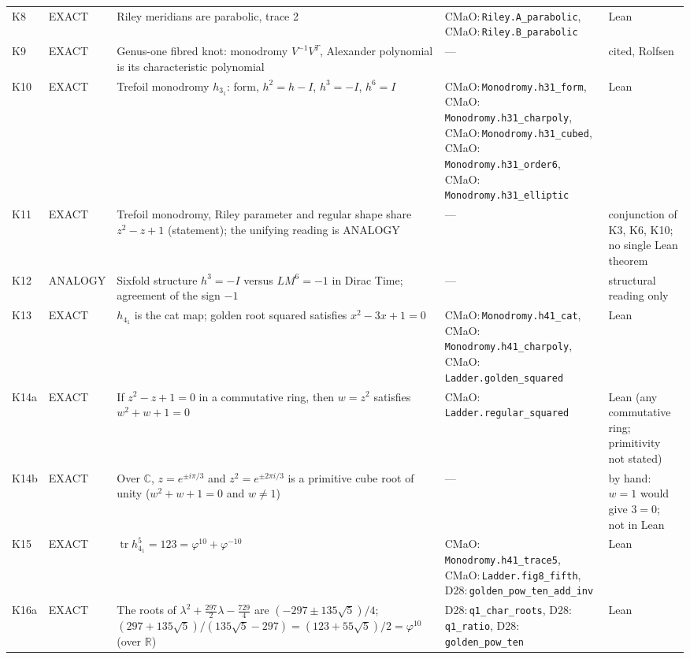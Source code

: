 \documentclass[11pt]{article}
\theoremstyle{definition}
\newcommand{\lean}[1]{\texttt{\small #1}}
\begin{document}
{\begin{longtable}{@{}L{0.05\textwidth}L{0.12\textwidth}L{0.26\textwidth}L{0.27\textwidth}L{0.17\textwidth}@{}}
K8 & EXACT & Riley meridians are parabolic, trace 2 & CMaO:\,\lean{Riley.\allowbreak{}A\_\allowbreak{}parabolic}, CMaO:\,\lean{Riley.\allowbreak{}B\_\allowbreak{}parabolic} & Lean\\
K9 & EXACT & Genus-one fibred knot: monodromy $V^{-1}V^T$, Alexander polynomial is its characteristic polynomial & --- & cited, Rolfsen\\
K10 & EXACT & Trefoil monodromy $h_{3_1}$: form, $h^2=h-I$, $h^3=-I$, $h^6=I$ & CMaO:\,\lean{Monodromy.\allowbreak{}h31\_\allowbreak{}form}, CMaO:\,\lean{Monodromy.\allowbreak{}h31\_\allowbreak{}charpoly}, CMaO:\,\lean{Monodromy.\allowbreak{}h31\_\allowbreak{}cubed}, CMaO:\,\lean{Monodromy.\allowbreak{}h31\_\allowbreak{}order6}, CMaO:\,\lean{Monodromy.\allowbreak{}h31\_\allowbreak{}elliptic} & Lean\\
K11 & EXACT & Trefoil monodromy, Riley parameter and regular shape share $z^2-z+1$ (statement); the unifying reading is ANALOGY & --- & conjunction of K3, K6, K10; no single Lean theorem\\
K12 & ANALOGY & Sixfold structure $h^3=-I$ versus $LM^6=-1$ in Dirac Time; agreement of the sign $-1$ & --- & structural reading only\\
K13 & EXACT & $h_{4_1}$ is the cat map; golden root squared satisfies $x^2-3x+1=0$ & CMaO:\,\lean{Monodromy.\allowbreak{}h41\_\allowbreak{}cat}, CMaO:\,\lean{Monodromy.\allowbreak{}h41\_\allowbreak{}charpoly}, CMaO:\,\lean{Ladder.\allowbreak{}golden\_\allowbreak{}squared} & Lean\\
K14a & EXACT & If $z^2-z+1=0$ in a commutative ring, then $w=z^2$ satisfies $w^2+w+1=0$ & CMaO:\,\lean{Ladder.\allowbreak{}regular\_\allowbreak{}squared} & Lean (any commutative ring; primitivity not stated)\\
K14b & EXACT & Over $\mathbb C$, $z=e^{\pm i\pi/3}$ and $z^2=e^{\pm2\pi i/3}$ is a primitive cube root of unity ($w^2+w+1=0$ and $w\neq1$) & --- & by hand: $w=1$ would give $3=0$; not in Lean\\
K15 & EXACT & $\operatorname{tr}h_{4_1}^5=123=\varphi^{10}+\varphi^{-10}$ & CMaO:\,\lean{Monodromy.\allowbreak{}h41\_\allowbreak{}trace5}, CMaO:\,\lean{Ladder.\allowbreak{}fig8\_\allowbreak{}fifth}, D28:\,\lean{golden\_\allowbreak{}pow\_\allowbreak{}ten\_\allowbreak{}add\_\allowbreak{}inv} & Lean\\
K16a & EXACT & The roots of $\lambda^2+\tfrac{297}{2}\lambda-\tfrac{729}{4}$ are $(-297\pm135\sqrt5)/4$; $(297+135\sqrt5)/(135\sqrt5-297)=(123+55\sqrt5)/2=\varphi^{10}$ (over $\mathbb R$) & D28:\,\lean{q1\_\allowbreak{}char\_\allowbreak{}roots}, D28:\,\lean{q1\_\allowbreak{}ratio}, D28:\,\lean{golden\_\allowbreak{}pow\_\allowbreak{}ten} & Lean\\

\end{longtable}}
\end{document}
